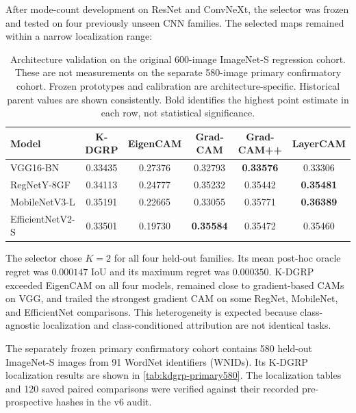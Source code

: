 After mode-count development on ResNet and ConvNeXt, the selector was frozen
and tested on four previously unseen CNN families. The selected maps remained
within a narrow localization range:

\begin{table}[!htbp]
\centering
\caption{Architecture validation on the original 600-image ImageNet-S
regression cohort. These are not measurements on the separate 580-image
primary confirmatory cohort. Frozen prototypes and calibration are
architecture-specific. Historical parent values are shown consistently. Bold
identifies the highest point estimate in each row, not statistical
significance.}
\label{tab:kdgrp-multiarch}
\small
\begin{tabular}{lccccc}
\toprule
Model & K-DGRP & EigenCAM & Grad-CAM & Grad-CAM++ & LayerCAM\\
\midrule
VGG16-BN          & 0.33435 & 0.27376 & 0.32793 & \textbf{0.33576} & 0.33306\\
\thinrowrule
RegNetY-8GF       & 0.34113 & 0.24777 & 0.35232 & 0.35442 & \textbf{0.35481}\\
\thinrowrule
MobileNetV3-L     & 0.35191 & 0.22665 & 0.33055 & 0.35771 & \textbf{0.36389}\\
\thinrowrule
EfficientNetV2-S  & 0.33501 & 0.19730 & \textbf{0.35584} & 0.35472 & 0.35460\\
\bottomrule
\end{tabular}
\end{table}

The selector chose $K=2$ for all four held-out families. Its mean post-hoc
oracle regret was $0.000147$ IoU and its maximum regret was $0.000350$. K-DGRP
exceeded EigenCAM on all four models, remained close to gradient-based CAMs on
VGG, and trailed the strongest gradient CAM on some RegNet, MobileNet, and
EfficientNet comparisons. This heterogeneity is expected because
class-agnostic localization and class-conditioned attribution are not identical
tasks.

The separately frozen primary confirmatory cohort contains 580 held-out
ImageNet-S images from 91 WordNet identifiers (WNIDs). Its K-DGRP localization
results are shown in \cref{tab:kdgrp-primary580}. The localization tables and
120 saved paired comparisons were verified against their recorded
pre-prospective hashes in the v6 audit.

